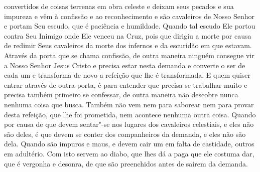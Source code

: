 convertidos de coisas terrenas em obra celeste e deixam seus pecados e sua
impureza e vêm à confissão e ao reconhecimento e são cavaleiros de Nosso Senhor
e portam Seu escudo, que é paciência e humildade. Quando tal escudo
Ele portou contra Seu Inimigo onde Ele venceu na Cruz, pois que dirigiu a morte
por causa de redimir Seus cavaleiros da morte dos infernos e da escuridão em
que estavam. Através da porta que se chama confissão, de outra maneira ninguém
consegue vir a Nosso Senhor Jesus Cristo e precisa estar nesta demanda e
converte o ser de cada um e transforma de novo a refeição que lhe é
transformada. E quem quiser entrar através de outra porta, é para entender que
precisa se trabalhar muito e precisa também primeiro se confessar, de outra
maneira não descobre nunca nenhuma coisa que busca. Também não vem nem para
saborear nem para provar desta refeição, que lhe foi prometida, nem acontece
nenhuma outra coisa. Quando por causa de que devem sentar"-se nos lugares dos
cavaleiros celestiais, e eles não são deles, é que devem se conter dos
companheiros da demanda, e eles não são dela. Quando são impuros e maus, e
devem cair um em falta de castidade, outros em adultério. Com isto servem ao
diabo, que lhes dá a paga que ele costuma dar, que é vergonha e desonra, de que
são preenchidos antes de saírem da demanda.


